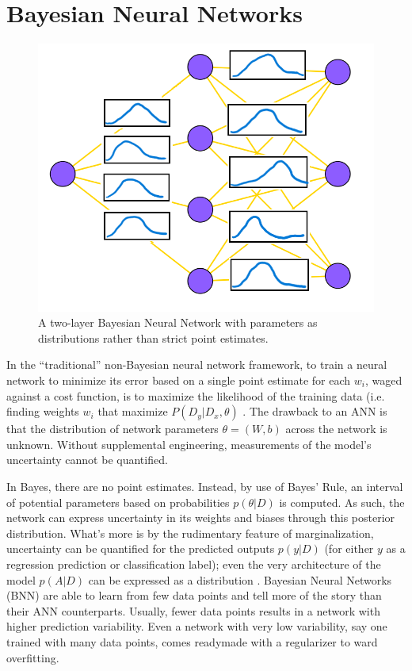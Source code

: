 \chapter{Bayesian Neural Networks}

\begin{figure}
  \vspace{-40pt}
    \centering
    \includegraphics[width=.35\textwidth]{Figures/BNN_weightstoc.png}
    \caption{\footnotesize{A two-layer Bayesian Neural Network with parameters as distributions rather than strict point estimates.}}
  \label{BayesNet}
  \vspace{-10pt}
\end{figure}

 In the ``traditional'' non-Bayesian neural network framework, to train a neural network to minimize its error based on a single point estimate for each $w_i$, waged against a cost function, is to maximize the likelihood of the training data (i.e. finding weights $w_i$ that maximize $P(D_y|D_x,\theta)$ \cite{bishop1995} \cite{bishop1997bayesian}.  The drawback to an ANN is that the distribution of network parameters $\theta = (W,b)$ across the network is unknown. \cite{mullachery2018bayesian}  Without supplemental engineering, measurements of the model's uncertainty cannot be quantified.
 
 In Bayes, there are no point estimates. Instead, by use of Bayes’ Rule, an interval of potential parameters based on probabilities $p(\theta|D)$ is computed.  As such, the network can express uncertainty in its weights and biases through this posterior distribution. What's more is by the rudimentary feature of marginalization, uncertainty can be quantified for the predicted outputs $p(y|D)$ (for either $y$ as a regression prediction or classification label); even the very architecture of the model $p(A|D)$ can be expressed as a distribution \cite{bishop1995}.
 Bayesian Neural Networks (BNN) are able to learn from few data points and tell more of the story than their ANN counterparts.  Usually, fewer data points results in a network with higher prediction variability.  Even a network with very low variability, say one trained with many data points, comes readymade with a regularizer to ward overfitting. \cite{vladimirova2019understanding}
 

